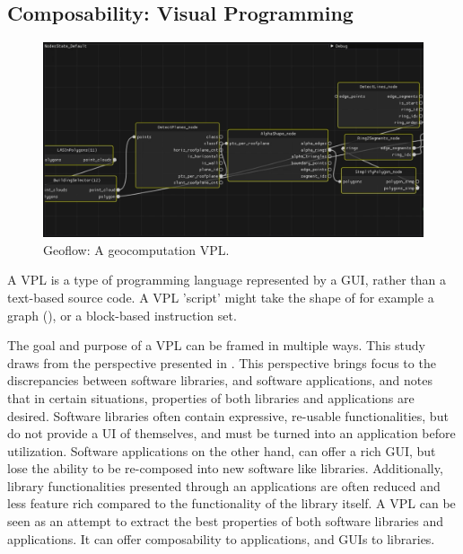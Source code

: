 \subsection*{Composability: Visual Programming}

\begin{figure}
  \centering
  \graphicspath{{../../assets/images/background/geo-vpl/}}
  \includegraphics[width=\linewidth]{geoflow.png}
  \caption{Geoflow: A geocomputation VPL. \citep{peters_geoflow_2019}}
  \label{fig:1:geoflow}
\end{figure}

A \ac{VPL} is a type of programming language represented by a \ac{GUI}, rather than a text-based source code.
A \ac{VPL} 'script' might take the shape of for example a graph (), or a block-based instruction set.

The goal and purpose of a VPL can be framed in multiple ways. 
This study draws from the perspective presented in \citep*{elliott_tangible_2007}.
This perspective brings focus to the discrepancies between software libraries, and software applications, and notes that in certain situations, properties of both libraries and applications are desired. 
Software libraries often contain expressive, re-usable functionalities, but do not provide a \ac{UI} of themselves, and must be turned into an application before utilization.
Software applications on the other hand, can offer a rich \ac{GUI}, but lose the ability to be re-composed into new software like libraries. Additionally, library functionalities presented through an applications are often reduced and less feature rich compared to the functionality of the library itself.
A VPL can be seen as an attempt to extract the best properties of both software libraries and applications. 
It can offer composability to applications, and \ac{GUI}s to libraries.
 
